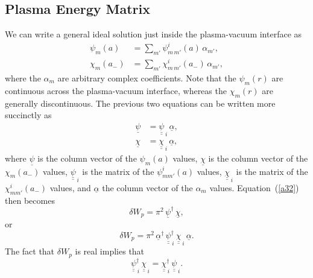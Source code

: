 \documentclass[12pt,prb,aps]{revtex4-1}
\begin{document}
\subsection{Plasma Energy Matrix}
We can write a general ideal solution just inside the plasma-vacuum interface as
\begin{align}
\psi_m(a) &= \sum_{m'}\psi_{m\,m'}^i(a)\,\alpha_{m'},\\[0.5ex]
\chi_m(a_-) &= \sum_{m'}\chi_{m\,m'}^i(a_-)\,\alpha_{m'},
\end{align}
where the $\alpha_m$ are arbitrary complex coefficients.  Note that the $\psi_m(r)$ are continuous across the plasma-vacuum interface, whereas the $\chi_m(r)$ are generally discontinuous. 
The previous two equations can be written more succinctly as
\begin{align}\label{e41}
\underline{\psi}&= \underline{\underline{\psi}}_{\,i}\,\underline{\alpha},\\[0.5ex]
\underline{\chi}&= \underline{\underline{\chi}}_{\,i}\,\underline{\alpha},\label{e42}
\end{align}
where $\underline{\psi}$ is the column vector of the $\psi_m(a)$ values, $\underline{\chi}$ is the column vector of the $\chi_m(a_-)$ values,
$\underline{\underline{\psi}}_{\,i}$ is the matrix of the $\psi_{mm'}^i(a)$ values, $\underline{\underline{\chi}}_{\,i}$ is the matrix of the $\chi_{mm'}^i(a_-)$ values,
and $\underline{\alpha}$ the column vector of the $\alpha_m$ values. 
Equation~(\ref{a32}) then becomes
\begin{equation}
\delta W_p=\pi^2\,\underline{\psi}^\dag\,\underline{\chi},
\end{equation} 
or
\begin{equation}\label{e44}
\delta W_p =\pi^2\, \underline{\alpha}^\dag\,\underline{\underline{\psi}}^{\dag}_{\,i}\,\underline{\underline{\chi}}_{\,i}\,\underline{\alpha}.
\end{equation}
The fact that $\delta W_p$ is real implies that
 \begin{equation}\label{e47}
 \underline{\underline{\psi}}^{\dag}_{\,i}\,\underline{\underline{\chi}}_{\,i}= \underline{\underline{\chi}}^{\dag}_{\,i}\,\underline{\underline{\psi}}_{\,i}.
 \end{equation}
\end{document}
